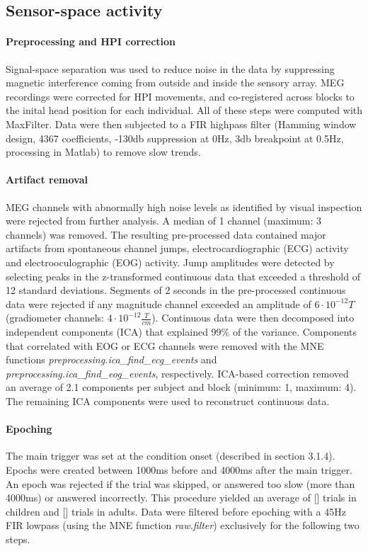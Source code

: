 \subsection{Sensor-space activity}

\paragraph{Preprocessing and HPI correction}
Signal-space separation \cite{3.3.SSS} was used to reduce noise in the data by suppressing magnetic interference coming from outside and inside the sensory array.
MEG recordings were corrected for HPI movements, and co-registered across blocks to the inital head position for each individual.
All of these steps were computed with MaxFilter.
Data were then subjected to a FIR highpass filter (Hamming window design, 4367 coefficients, -130db suppression at 0Hz, 3db breakpoint at 0.5Hz, processing in Matlab) to remove slow trends.

\paragraph{Artifact removal}
MEG channels with abnormally high noise levels as identified by visual inspection were rejected from further analysis. A median of 1 channel (maximum: 3 channels) was removed.
The resulting pre-processed data contained major artifacts from spontaneous channel jumps, electrocardiographic (ECG) activity and electrooculographic (EOG) activity.
Jump amplitudes were detected by selecting peaks in the z-transformed continuous data that exceeded a threshold of 12 standard deviations.
Segments of 2 seconds in the pre-processed continuous data were rejected if any magnitude channel exceeded an amplitude of $6\cdot10^{-12}T$ (gradiometer channels: $4\cdot10^{-12}\frac{T}{cm}$).
Continuous data were then decomposed into independent components (ICA) that explained 99\% of the variance.
Components that correlated with EOG or ECG channels were removed with the MNE functions \emph{preprocessing.ica\_find\_ecg\_events} and \emph{preprocessing.ica\_find\_eog\_events}, respectively.
ICA-based correction removed an average of 2.1 components per subject and block (minimum: 1, maximum: 4).
The remaining ICA components were used to reconstruct continuous data.

\paragraph{Epoching}
The main trigger was set at the condition onset (described in section 3.1.4).
Epochs were created between 1000ms before and 4000ms after the main trigger.
An epoch was rejected if the trial was skipped, or answered too slow (more than 4000ms) or answered incorrectly.
This procedure yielded an average of [] trials in children and [] trials in adults.
Data were filtered before epoching with a 45Hz FIR lowpass (using the MNE function \emph{raw.filter}) exclusively for the following two steps.

